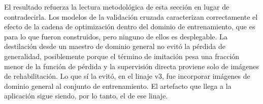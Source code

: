 El resultado refuerza la lectura metodológica de esta sección en lugar de contradecirla. Los modelos de la validación cruzada caracterizan correctamente el efecto de la cadena de optimización dentro del dominio de entrenamiento, que es para lo que fueron construidos, pero ninguno de ellos es desplegable. La destilación desde un maestro de dominio general no evitó la pérdida de generalidad, posiblemente porque el término de imitación pesa una fracción menor de la función de pérdida y la supervisión directa proviene solo de imágenes de rehabilitación. Lo que sí la evitó, en el linaje v3, fue incorporar imágenes de dominio general al conjunto de entrenamiento. El artefacto que llega a la aplicación sigue siendo, por lo tanto, el de ese linaje.
